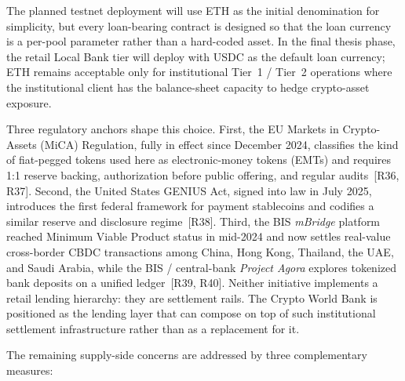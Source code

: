 \documentclass[12pt,a4paper]{report}
\begin{document}
The planned testnet deployment will use ETH as the initial denomination for simplicity, but every loan-bearing contract is designed so that the loan currency is a per-pool parameter rather than a hard-coded asset. In the final thesis phase, the retail Local Bank tier will deploy with USDC as the default loan currency; ETH remains acceptable only for institutional Tier~1 / Tier~2 operations where the institutional client has the balance-sheet capacity to hedge crypto-asset exposure.

Three regulatory anchors shape this choice. First, the EU Markets in Crypto-Assets (MiCA) Regulation, fully in effect since December 2024, classifies the kind of fiat-pegged tokens used here as electronic-money tokens (EMTs) and requires 1{:}1 reserve backing, authorization before public offering, and regular audits~[R36, R37]. Second, the United States GENIUS Act, signed into law in July 2025, introduces the first federal framework for payment stablecoins and codifies a similar reserve and disclosure regime~[R38]. Third, the BIS \textit{mBridge} platform reached Minimum Viable Product status in mid-2024 and now settles real-value cross-border CBDC transactions among China, Hong Kong, Thailand, the UAE, and Saudi Arabia, while the BIS / central-bank \textit{Project Agora} explores tokenized bank deposits on a unified ledger~[R39, R40]. Neither initiative implements a retail lending hierarchy: they are settlement rails. The Crypto World Bank is positioned as the lending layer that can compose on top of such institutional settlement infrastructure rather than as a replacement for it.

The remaining supply-side concerns are addressed by three complementary measures:
\end{document}
